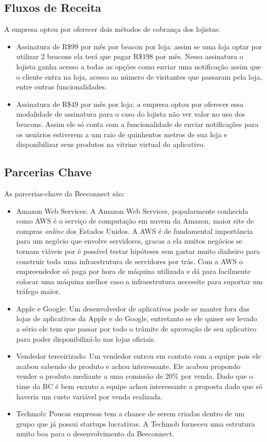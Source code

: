 \subsection{Fluxos de Receita}
\label{cha:fluxos_de_receita}
A empresa optou por oferecer dois métodos de cobrança dos lojistas:
\begin{itemize}
\item Assinatura de R\$99 por mês por beacon por loja: assim se uma loja optar por utilizar 2 beacons ela terá que pagar R\$198 por mês. Nessa assinatura o lojista ganha acesso a todas as opções como enviar uma notificação assim que o cliente entra na loja, acesso ao número de visitantes que passaram pela loja, entre outras funcionalidades.
\item Assinatura de R\$49 por mês por loja: a empresa optou por oferecer essa modalidade de assinatura para o caso do lojista não ver valor no uso dos beacons. Assim ele só conta com a funcionalidade de enviar notificações para os usuários estiverem a um raio de quinhentos metros de sua loja e disponibilizar seus produtos na vitrine virtual do aplicativo.
\end{itemize}

\subsection{Parcerias Chave}
\label{cha:parcerias_chave}
As parcerias-chave da Beeconnect são:
\begin{itemize}
\item Amazon Web Services: A Amazon Web Services, popularmente conhecida como AWS é o serviço de computação em nuvem da Amazon, maior site de compras \textit{online} dos Estados Unidos. A AWS é de fundamental importância para um negócio que envolve servidores, gracas a ela muitos negócios se tornam viáveis por é possível testar hipóteses sem gastar muito dinheiro para construir toda uma infraestrutura de servidores por trás. Com a AWS o empreendedor só paga por hora de máquina utilizada e dá para facilmente colocar uma máquina melhor caso a infraestrutura necessite para suportar um tráfego maior.
\item Apple e Google: Um desenvolvedor de aplicativos pode se manter fora das lojas de aplicativos da Apple e do Google, entretanto se ele quiser ser levado a sério ele tem que passar por todo o trâmite de aprovação de seu aplicativo para poder disponibilizá-lo nas lojas oficiais. 
\item Vendedor terceirizado: Um vendedor entrou em contato com a equipe pois ele acabou sabendo do produto e achou interessante. Ele acabou propondo vender o produto mediante a uma comissão de 20\% por venda. Dado que o time da BC é bem enxuto a equipe achou interessante a proposta dado que só haveria um custo variável por venda realizada.
\item Techmob: Poucas empresas tem a chance de serem criadas dentro de um grupo que já possui startups lucrativas. A Techmob forneceu uma estrutura muito boa para o desenvolvimento da Beeconnect.
\end{itemize}

